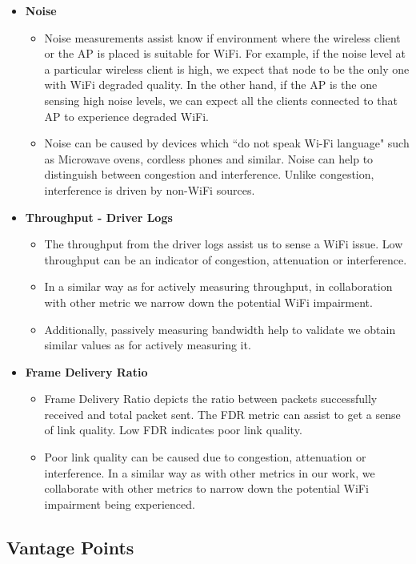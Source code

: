 \begin{itemize}
	\item \textbf{Noise}
	\begin{itemize}
		\item  Noise measurements assist know if environment where the wireless client or the AP is placed is suitable for WiFi. For example, if the noise level at a particular wireless client is high, we expect that node to be the only one with WiFi degraded quality. In the other hand, if the AP is the one sensing high noise levels, we can expect all the clients connected to that AP to experience degraded WiFi.
		\item Noise can be caused by devices which ``do not speak Wi-Fi language" such as Microwave ovens, cordless phones and similar. Noise can help to distinguish between congestion and interference. Unlike congestion, interference is driven by non-WiFi sources.
	\end{itemize}
	
	\item \textbf{Throughput - Driver Logs}
	\begin{itemize}
		\item The throughput from the driver logs assist us to sense a WiFi issue. Low throughput can be an indicator of congestion, attenuation or interference.
		\item In a similar way as for actively measuring throughput, in collaboration with other metric we narrow down the potential WiFi impairment.
		\item Additionally, passively measuring bandwidth help to validate we obtain similar values as for actively measuring it.
	\end{itemize}
	\newpage
	\item \textbf{Frame Delivery Ratio}
	\begin{itemize}
		\item Frame Delivery Ratio depicts the ratio between packets successfully received and total packet sent. The FDR metric can assist to get a sense of link quality. Low FDR indicates poor link quality. 
		\item Poor link quality can be caused due to congestion, attenuation or interference. In a similar way as with other metrics in our work, we collaborate with other metrics to narrow down the potential WiFi impairment being experienced.
	\end{itemize}

\end{itemize}

\subsection{Vantage Points}

